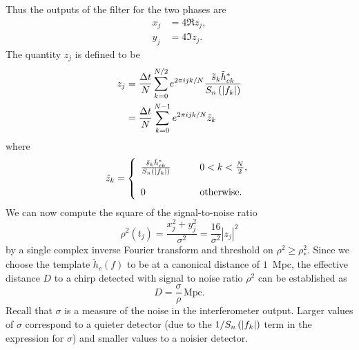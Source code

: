 Thus the outputs of the filter for the two phases are
\begin{align}
x_j &= 4 \Re z_j, \\
y_j &= 4 \Im z_j.
\end{align}
The quantity $z_j$ is defined to be
\begin{equation}
\begin{split}
\label{eq:zdef}
z_j &= \frac{\Delta t}{N}\sum_{k=0}^{N/2} e^{2\pi ijk/N} 
\frac{\tilde{s}_k \tilde{h}_{ck}^\ast}{S_n\left(\left|f_{k}\right|\right)}  \\
&= \frac{\Delta t}{N}\sum_{k=0}^{N-1} e^{2\pi ijk/N} \tilde{z}_k
\end{split}
\end{equation}
where
\begin{equation}
\label{eq:ztildedef}
\tilde{z}_k = \left\{
\begin{array}{ll}
\frac{\tilde{s}_k \tilde{h}_{ck}^\ast}{S_n\left(\left|f_{k}\right|\right)} 
  \quad\quad & 0 < k < \frac{N}{2},\\
\\
0 & \mathrm{otherwise}.
\end{array}
\right.
\end{equation}
We can now compute the square of the signal-to-noise ratio
\begin{equation}
\rho^2(t_j) = \frac{x_j^2 + y_j^2}{\sigma^2} = \frac{16}{\sigma^2}|z_j|^2
\end{equation}
by a single complex inverse Fourier transform and threshold on $\rho^2 \ge
\rho^2_\ast$.  Since we choose the template $\tilde{h}_c(f)$ to be at a
canonical distance of $1$~Mpc, the effective distance $D$ to a chirp
detected with signal to noise ratio $\rho^2$ can be established as
\begin{equation}
D = \frac{\sigma}{\rho} \,\mathrm{Mpc}.
\label{eq:effdistdef}
\end{equation}
Recall that $\sigma$ is a measure of the noise in the interferometer output.
Larger values of $\sigma$ correspond to a quieter detector (due to the
$1/S_n\left(\left|f_{k}\right|\right)$ term in the expression for $\sigma$) and smaller values to a
noisier detector. 


